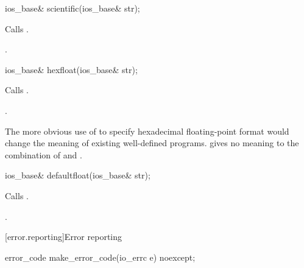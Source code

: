 \begin{indexed}{}
\begin{itemdecl}
ios_base& scientific(ios_base& str);
\end{itemdecl}
\end{indexed}

\begin{itemdescr}
\pnum
\effects
Calls
.

\pnum
\returns
{}.
\end{itemdescr}

\begin{indexed}{}
\begin{itemdecl}
ios_base& hexfloat(ios_base& str);
\end{itemdecl}
\end{indexed}

\begin{itemdescr}
\pnum
\effects
Calls .

\pnum
\returns
{}.
\end{itemdescr}

\pnum
\begin{note}
The more obvious use of
 to specify hexadecimal floating-point format would
change the meaning of existing well-defined programs. \CppIII{}
gives no meaning to the combination of  and
.
\end{note}

%
\begin{itemdecl}
ios_base& defaultfloat(ios_base& str);
\end{itemdecl}

\begin{itemdescr}
\pnum
\effects
Calls .

\pnum
\returns
{}.
\end{itemdescr}

[error.reporting]{Error reporting}

\begin{indexed}{}
\begin{itemdecl}
error_code make_error_code(io_errc e) noexcept;
\end{itemdecl}
\end{indexed}

